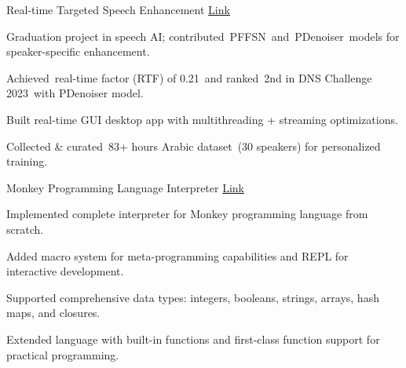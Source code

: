 

\begin{cventries}

  \cventry
    {Real-time Targeted Speech Enhancement} %
    {} %
    {}
    {\textcolor{link}{\href{https://github.com/ad3ldev/Realtime-Targeted-Speech-Enhancement}{Link}}} %
    {
      \begin{cvitems} %
        \item {Graduation project in speech AI; contributed PFFSN and PDenoiser models for speaker-specific enhancement.}
        \item {Achieved real-time factor (RTF) of 0.21 and ranked 2nd in DNS Challenge 2023 with PDenoiser model.}
        \item {Built real-time GUI desktop app with multithreading + streaming optimizations.}
        \item {Collected \& curated 83+ hours Arabic dataset (30 speakers) for personalized training.}
      \end{cvitems}
    }



  \cventry
    {Monkey Programming Language Interpreter} %
    {} %
    {}
    {\textcolor{link}{\href{https://github.com/ad3ldev/monkey-lang}{Link}}} %
    {
      \begin{cvitems} %
        \item {Implemented complete interpreter for Monkey programming language from scratch.}
        \item {Added macro system for meta-programming capabilities and REPL for interactive development.}
        \item {Supported comprehensive data types: integers, booleans, strings, arrays, hash maps, and closures.}
        \item {Extended language with built-in functions and first-class function support for practical programming.}
      \end{cvitems}
    }

  


\end{cventries}
